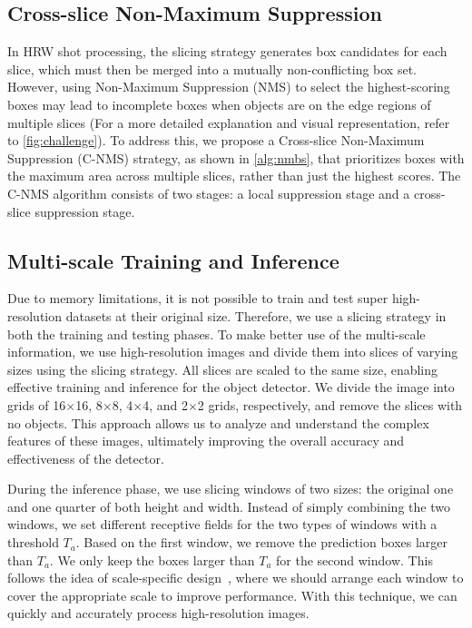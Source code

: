 \subsection{Cross-slice Non-Maximum Suppression}


In HRW shot processing, the slicing strategy generates box candidates for each slice, which must then be merged into a mutually non-conflicting box set. However, using Non-Maximum Suppression (NMS) to select the highest-scoring boxes may lead to incomplete boxes when objects are on the edge regions of multiple slices (For a more detailed explanation and visual representation, refer to \cref{fig:challenge}). To address this, we propose a Cross-slice Non-Maximum Suppression (C-NMS) strategy, as shown in \cref{alg:nmbs}, that prioritizes boxes with the maximum area across multiple slices, rather than just the highest scores. The C-NMS algorithm consists of two stages: a local suppression stage and a cross-slice suppression stage.

\subsection{Multi-scale Training and Inference}



Due to memory limitations, it is not possible to train and test super high-resolution datasets at their original size. Therefore, we use a slicing strategy in both the training and testing phases. 
To make better use of the multi-scale information, we use high-resolution images and divide them into slices of varying sizes using the slicing strategy. All slices are scaled to the same size, enabling effective training and inference for the object detector. We divide the image into grids of 16$\times$16, 8$\times$8, 4$\times$4, and 2$\times$2 grids, respectively, and remove the slices with no objects. This approach allows us to analyze and understand the complex features of these images, ultimately improving the overall accuracy and effectiveness of the detector.

During the inference phase, we use slicing windows of two sizes: the original one and one quarter of both height and width.
Instead of simply combining the two windows, we set different receptive fields for the two types of windows with a threshold $T_a$. Based on the first window, we remove the prediction boxes larger than $T_a$. We only keep the boxes larger than $T_a$ for the second window. This follows the idea of scale-specific design~\cite{singh2018analysis, singh2018sniper}, where we should arrange each window to cover the appropriate scale to improve performance. With this technique, we can quickly and accurately process high-resolution images.
